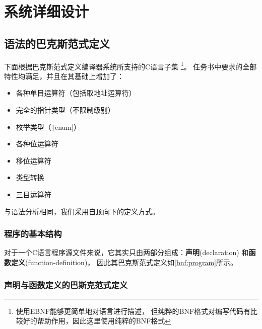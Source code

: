 \chapter{系统详细设计}


\section{语法的巴克斯范式定义}\label{sec:bnf}

下面根据巴克斯范式定义编译器系统所支持的C语言子集
\footnote{使用EBNF能够更简单地对语言进行描述，
	但纯粹的BNF格式对编写代码有比较好的帮助作用，因此这里使用纯粹的BNF格式}。
任务书中要求的全部特性均满足，并且在其基础上增加了：
\begin{itemize}
	\item 各种单目运算符（包括取地址运算符）
	\item 完全的指针类型（不限制级别）
	\item 枚举类型（\texttt|enum|）
	\item 各种位运算符
	\item 移位运算符
	\item 类型转换
	\item 三目运算符
\end{itemize}

与语法分析相同，我们采用自顶向下的定义方式。

\subsection{程序的基本结构}

对于一个C语言程序源文件来说，它其实只由两部分组成：{\bf 声明}(declaration)
和{\bf 函数定义}(function-definition)，
因此其巴克斯范式定义如\autoref{bnf:program}所示。

\begin{bnf}
	\label{bnf:program}
\end{bnf}

\subsection{声明与函数定义的巴斯克范式定义}

